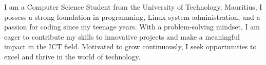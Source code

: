 

\begin{cvparagraph}

I am a Computer Science Student from the University of Technology, Mauritius, I possess a strong foundation in programming, Linux system administration, and a passion for coding since my teenage years. With a problem-solving mindset, I am eager to contribute my skills to innovative projects and make a meaningful impact in the ICT field. Motivated to grow continuously, I seek opportunities to excel and thrive in the world of technology.
\end{cvparagraph}

